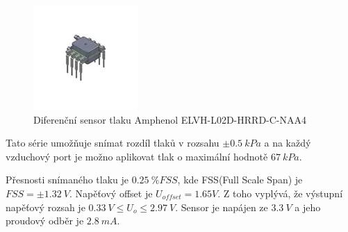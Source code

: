 \begin{figure}[H]
    \centering
    \includegraphics{pictures/amphenol.jpg}
    \caption{Diferenční sensor tlaku Amphenol ELVH-L02D-HRRD-C-NAA4}
    \label{fig:amphenol}
\end{figure}
Tato série umožňuje snímat rozdíl tlaků v rozsahu $\pm 0.5 \ kPa$ a na každý vzduchový port je možno aplikovat tlak o maximální hodnotě $67 \ kPa$. \par 
Přesnosti snímaného tlaku je  $0.25 \ \% FSS$, kde FSS(Full Scale Span) je  $FSS = \pm 1.32 \ V $. Napěťový offset je $U_{offset} = 1.65 V$. Z toho vyplývá, že výstupní napěťový rozsah je $0.33 \ V \leq U_o \leq 2.97 \ V$. 
Sensor je napájen ze $3.3 \ V $ a jeho proudový odběr je $2.8 \ mA $.

